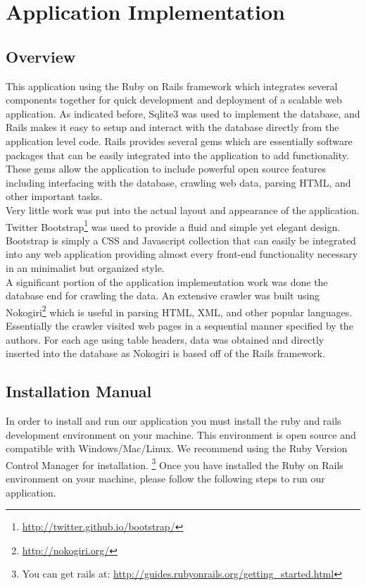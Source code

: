 \documentclass[12pt,letterpaper]{article}
\begin{document}
\clearpage\null

\section{Application Implementation}

\subsection{Overview}
This application using the Ruby on Rails framework which integrates several components together for quick development and deployment of a scalable web application. As indicated before, Sqlite3 was used to implement the database, and Rails makes it easy to setup and interact with the database directly from the application level code. Rails provides several gems which are essentially software packages that can be easily integrated into the application to add functionality. These gems allow the application to include powerful open source features including interfacing with the database, crawling web data, parsing HTML, and other important tasks. \\

Very little work was put into the actual layout and appearance of the application. Twitter Bootstrap\footnote{\url{http://twitter.github.io/bootstrap/}} was used to provide a fluid and simple yet elegant design. Bootstrap is simply a CSS and Javascript collection that can easily be integrated into any web application providing almost every front-end functionality necessary in an minimalist but organized style. \\

A significant portion of the application implementation work was done the database end for crawling the data. An extensive crawler was built using Nokogiri\footnote{\url{http://nokogiri.org/}} which is useful in parsing HTML, XML, and other popular languages. Essentially the crawler visited web pages in a sequential manner specified by the authors. For each age using table headers, data was obtained and directly inserted into the database as Nokogiri is based off of the Rails framework.

\subsection{Installation Manual}
In order to install and run our application you must install the ruby and rails development environment on your machine. This environment is open source and compatible with Windows/Mac/Linux. We recommend using the Ruby Version Control Manager for installation. \footnote{You can get rails at: \url{http://guides.rubyonrails.org/getting_started.html}} Once you have installed the Ruby on Rails environment on your machine, please follow the following steps to run our application.
\end{document}
